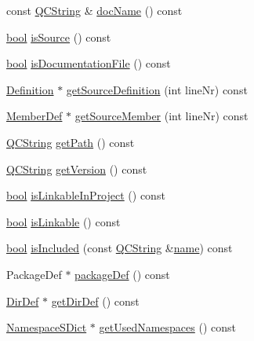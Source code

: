 \begin{DoxyCompactItemize}
\item 
const \hyperlink{class_q_c_string}{Q\+C\+String} \& \hyperlink{class_file_def_a146b2098e61dfc7dd4ee388e92c33201}{doc\+Name} () const 
\item 
\hyperlink{qglobal_8h_a1062901a7428fdd9c7f180f5e01ea056}{bool} \hyperlink{class_file_def_a55085b4099e8e80109dd8dd7ce87e5a5}{is\+Source} () const 
\item 
\hyperlink{qglobal_8h_a1062901a7428fdd9c7f180f5e01ea056}{bool} \hyperlink{class_file_def_ad04cfe6d74948db700b140fbbf371792}{is\+Documentation\+File} () const 
\item 
\hyperlink{class_definition}{Definition} $\ast$ \hyperlink{class_file_def_a1fe9fd5e6f8b50c24510d718c2ff2934}{get\+Source\+Definition} (int line\+Nr) const 
\item 
\hyperlink{class_member_def}{Member\+Def} $\ast$ \hyperlink{class_file_def_a6f002fe1d775e3ea73c590cba1c141fe}{get\+Source\+Member} (int line\+Nr) const 
\item 
\hyperlink{class_q_c_string}{Q\+C\+String} \hyperlink{class_file_def_a5d488e6a03d18ecf3e9236b9a2fd5e5e}{get\+Path} () const 
\item 
\hyperlink{class_q_c_string}{Q\+C\+String} \hyperlink{class_file_def_ae05a431076ed53fdbe3dbac7c709c3d7}{get\+Version} () const 
\item 
\hyperlink{qglobal_8h_a1062901a7428fdd9c7f180f5e01ea056}{bool} \hyperlink{class_file_def_a19db473ad3a95f44c28b0ba2378fdac2}{is\+Linkable\+In\+Project} () const 
\item 
\hyperlink{qglobal_8h_a1062901a7428fdd9c7f180f5e01ea056}{bool} \hyperlink{class_file_def_af677cee8c349fa10532b0aa5c09df396}{is\+Linkable} () const 
\item 
\hyperlink{qglobal_8h_a1062901a7428fdd9c7f180f5e01ea056}{bool} \hyperlink{class_file_def_ac5b097438bb5a4c2a0b459a7f7de8b5e}{is\+Included} (const \hyperlink{class_q_c_string}{Q\+C\+String} \&\hyperlink{class_file_def_a80989971450b35c785a8fe0002e1c2db}{name}) const 
\item 
Package\+Def $\ast$ \hyperlink{class_file_def_ac370bca3e46c5895e2b60277b706107e}{package\+Def} () const 
\item 
\hyperlink{class_dir_def}{Dir\+Def} $\ast$ \hyperlink{class_file_def_a83d21bb61a53c6edd319cc9bdc08e524}{get\+Dir\+Def} () const 
\item 
\hyperlink{class_namespace_s_dict}{Namespace\+S\+Dict} $\ast$ \hyperlink{class_file_def_adf153f39e6a86cee583f7dbb7d82b65a}{get\+Used\+Namespaces} () const 
\item 

\end{DoxyCompactItemize}
